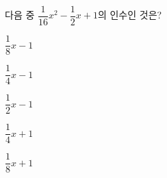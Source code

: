 다음 중 $\dfrac{1}{16}x^2-\dfrac{1}{2}x+1$의 인수인 것은?
\begin{choices32}{\rule[-3ex]{0pt}{8ex}$\dfrac{1}{8}x-1$}{\rule[-3ex]{0pt}{8ex}$\dfrac{1}{4}x-1$}{\rule[-3ex]{0pt}{8ex}$\dfrac{1}{2}x-1$}{\rule[-3ex]{0pt}{8ex}$\dfrac{1}{4}x+1$}{\rule[-3ex]{0pt}{8ex}$\dfrac{1}{8}x+1$}\end{choices32}
